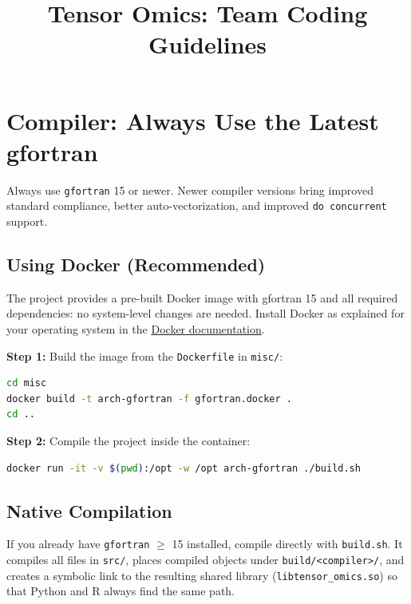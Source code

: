 \documentclass{article}
\title{Tensor Omics: Team Coding Guidelines}
\begin{document}
\maketitle

\tableofcontents
\vspace{1cm}

\newpage

\section{Compiler: Always Use the Latest gfortran}

Always use \texttt{gfortran} 15 or newer. Newer compiler versions bring improved standard compliance, better auto-vectorization, and improved \texttt{do concurrent} support.

\subsection{Using Docker (Recommended)}

The project provides a pre-built Docker image with gfortran 15 and all required dependencies: no system-level changes are needed. Install Docker as explained for your operating system in the \href{https://docs.docker.com/get-docker/}{Docker documentation}.

\textbf{Step 1:} Build the image from the \texttt{Dockerfile} in \texttt{misc/}:

\begin{lstlisting}[language=bash]
cd misc
docker build -t arch-gfortran -f gfortran.docker .
cd ..
\end{lstlisting}

\textbf{Step 2:} Compile the project inside the container:

\begin{lstlisting}[language=bash]
docker run -it -v $(pwd):/opt -w /opt arch-gfortran ./build.sh
\end{lstlisting}

\subsection{Native Compilation}

If you already have \texttt{gfortran} $\geq$ 15 installed, compile directly with \texttt{build.sh}. It compiles all files in \texttt{src/}, places compiled objects under \texttt{build/<compiler>/}, and creates a symbolic link to the resulting shared library (\texttt{libtensor\_omics.so}) so that Python and R always find the same path.
\end{document}
